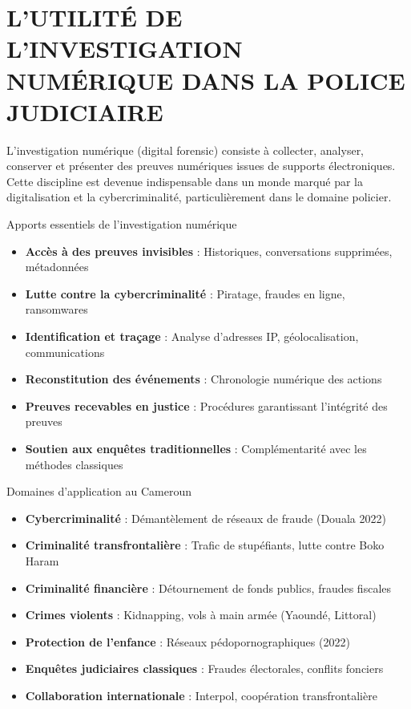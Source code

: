 \documentclass[12pt, a4em]{article}
\begin{document}
	\section{L’UTILITÉ DE L’INVESTIGATION NUMÉRIQUE DANS LA POLICE JUDICIAIRE}
	
	L'investigation numérique (digital forensic) consiste à collecter, analyser, conserver et présenter des preuves numériques issues de supports électroniques. Cette discipline est devenue indispensable dans un monde marqué par la digitalisation et la cybercriminalité, particulièrement dans le domaine policier.
	
	Apports essentiels de l'investigation numérique
	\begin{itemize}
		\item \textbf{Accès à des preuves invisibles} : Historiques, conversations supprimées, métadonnées
		\item \textbf{Lutte contre la cybercriminalité} : Piratage, fraudes en ligne, ransomwares
		\item \textbf{Identification et traçage} : Analyse d'adresses IP, géolocalisation, communications
		\item \textbf{Reconstitution des événements} : Chronologie numérique des actions
		\item \textbf{Preuves recevables en justice} : Procédures garantissant l'intégrité des preuves
		\item \textbf{Soutien aux enquêtes traditionnelles} : Complémentarité avec les méthodes classiques
	\end{itemize}
	
	Domaines d'application au Cameroun
	\begin{itemize}
		\item \textbf{Cybercriminalité} : Démantèlement de réseaux de fraude (Douala 2022)
		\item \textbf{Criminalité transfrontalière} : Trafic de stupéfiants, lutte contre Boko Haram
		\item \textbf{Criminalité financière} : Détournement de fonds publics, fraudes fiscales
		\item \textbf{Crimes violents} : Kidnapping, vols à main armée (Yaoundé, Littoral)
		\item \textbf{Protection de l'enfance} : Réseaux pédopornographiques (2022)
		\item \textbf{Enquêtes judiciaires classiques} : Fraudes électorales, conflits fonciers
		\item \textbf{Collaboration internationale} : Interpol, coopération transfrontalière
	\end{itemize}
	
\end{document}
